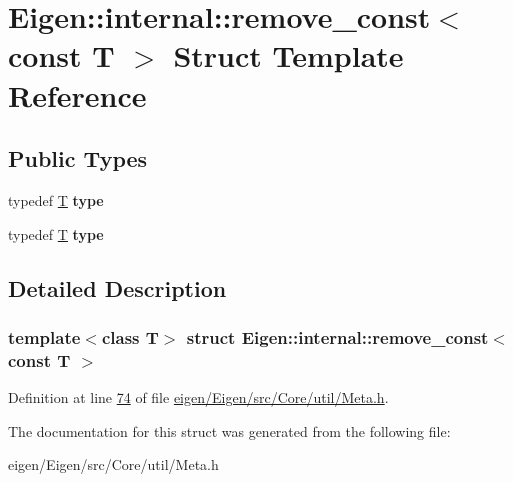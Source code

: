 \hypertarget{struct_eigen_1_1internal_1_1remove__const_3_01const_01_t_01_4}{}\section{Eigen\+:\+:internal\+:\+:remove\+\_\+const$<$ const T $>$ Struct Template Reference}
\label{struct_eigen_1_1internal_1_1remove__const_3_01const_01_t_01_4}
\subsection*{Public Types}
\begin{DoxyCompactItemize}
\item 
\mbox{\label{struct_eigen_1_1internal_1_1remove__const_3_01const_01_t_01_4_a454aa1ca0009359ceb5405db5419f302}} 
typedef \hyperlink{group___sparse_core___module}{T} {\bfseries type}
\item 
\mbox{\label{struct_eigen_1_1internal_1_1remove__const_3_01const_01_t_01_4_a454aa1ca0009359ceb5405db5419f302}} 
typedef \hyperlink{group___sparse_core___module}{T} {\bfseries type}
\end{DoxyCompactItemize}


\subsection{Detailed Description}
\subsubsection*{template$<$class T$>$\newline
struct Eigen\+::internal\+::remove\+\_\+const$<$ const T $>$}



Definition at line \hyperlink{eigen_2_eigen_2src_2_core_2util_2_meta_8h_source_l00074}{74} of file \hyperlink{eigen_2_eigen_2src_2_core_2util_2_meta_8h_source}{eigen/\+Eigen/src/\+Core/util/\+Meta.\+h}.



The documentation for this struct was generated from the following file\+:\begin{DoxyCompactItemize}
\item 
eigen/\+Eigen/src/\+Core/util/\+Meta.\+h\end{DoxyCompactItemize}
